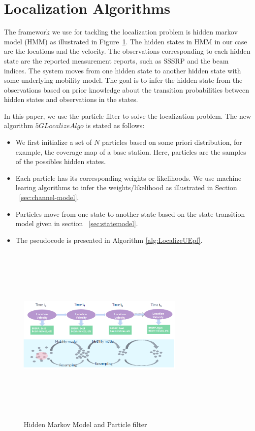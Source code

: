 \documentclass[conference, 10pt]{IEEEtran}
\begin{document}
\section{Localization Algorithms}
\label{sec:localalgo}

The framework we use for tackling the localization problem is hidden markov model (HMM) as illustrated 
in Figure~\ref{fig:hmm_particle}. The hidden states in HMM in our case are the locations and the velocity. 
The observations corresponding to each hidden state are the reported measurement reports, such as SSSRP and the beam indices.
The system moves from one hidden state to another hidden state with some underlying mobility model. 
The goal is to infer the hidden state from the observations based on
prior knowledge about the transition probabilities between hidden states and
observations in the states.

In this paper, we use the particle filter to solve the localization problem. The new algorithm $5GLocalizeAlgo$ is stated as follows:
\begin{itemize}
	\item We first initialize a set of $N$ particles based on some priori distribution, for example, the coverage map of a base station.
	Here, particles are the samples of the possibles hidden states. 
	\item Each particle has its corresponding weights or likelihoods. We use machine learing algorithms to infer the weights/likelihood as illustrated in Section ~\ref{sec:channel-model}.
	\item Particles move from one state to another state based 
	on the state transition model given in section ~\ref{sec:statemodel}.
	\item The pseudocode is presented in Algorithm \ref{alg:LocalizeUEpf}.
\end{itemize}

\begin{figure}[t]
	\begin{center}
	\includegraphics[height=3.5in,width=3.2in]{./HMM_ParticleFilter_Illustration.png}
	\caption{\label{fig:hmm_particle}
	{\small Hidden Markov Model and Particle filter}}
	\end{center}
	\end{figure}
\end{document}
